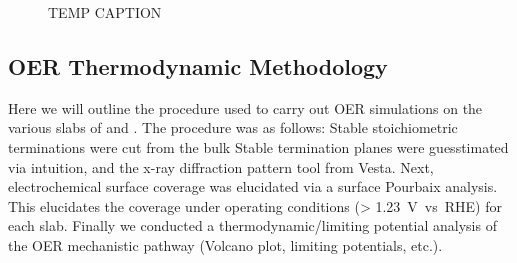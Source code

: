 \begin{figure}[!htb]
\centering
{}
\caption{\label{fig:bulk_pourbaix_wo_alpha}
TEMP CAPTION
}
\end{figure}



\subsection{OER Thermodynamic Methodology}  %
%
%
Here we will outline the procedure used to carry out OER simulations on the various slabs of \IrOtwo and \IrOthree.
%
The procedure was as follows:
%
Stable stoichiometric terminations were cut from the bulk
%
Stable termination planes were guesstimated via intuition, and the x-ray diffraction pattern tool from Vesta.
%
Next, electrochemical surface coverage was elucidated via a surface Pourbaix analysis.
%
This elucidates the coverage under operating conditions (> \SI{1.23}{\volt vs. RHE}) for each slab.
%
Finally we conducted a thermodynamic/limiting potential analysis of the OER mechanistic pathway (Volcano plot, limiting potentials, etc.).


